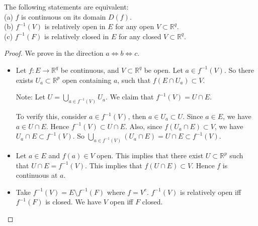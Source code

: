 \begin{theorem}
	The following statements are equivalent:\\
(a) $f$ is continuous on its domain $D(f)$.\\
(b) $f^{-1}(V)$ is relatively open in $E$ for any open  $V \subset \mathbb{R}^q$.\\
(c) $f^{-1} (F)$ is relatively closed in $E$ for any closed $V \subset \mathbb{R}^q$.
\end{theorem}
\begin{proof}
	We prove in the direction $a\iff  b \iff  c$.
	\begin{itemize}
		\item [(a) implies (b)]
			Let $f: E \to  \mathbb{R}^q$ be continuous, and $V \subset \mathbb{R}^q$ be open. Let $a \in f^{-1} (V)$. So there exists $U_a \subset \mathbb{R}^p$ open containing $a$, such that $f(E \cap U_a) \subset V$. 

			Note: Let $U = \bigcup_{a \in f^{-1} (V)} U_a $. We claim that $f^{-1} (V) = U \cap E$.

			To verify this, consider $a \in f^{-1} (V)$, then $a \in U_a \subset U$. Since $a \in E$, we have $a \in U \cap E$. Hence $f^{-1} (V) \subset U \cap E$.
			Also, since $f(U_a \cap E) \subset V$, we have $U_a \cap E \subset f^{-1} (V)$. So $\bigcup_{a \in f^{-1} (V)} \left( U_a \cap E \right)  = U \cap E \subset f^{-1} (V)$.
		\item [(b) implies (a)]
			Let $a \in E$ and $f(a) \in V$ open. This implies that there exist $U \subset \mathbb{R}^p $ such that $U \cap E = f^{-1} (V)$. This implies that $f(U \cap E) \subset V$. Hence $f$ is continuous at $a$.
		\item [(b) equivalent to (c)]
			Take $f^{-1} (V) = E \setminus f^{-1} (F)$ where $f = V^c$. $f^{-1} (V)$ is relatively open iff $f^{-1} (F)$ is closed. We have $V$ open iff $F$ closed.
	\end{itemize}
\end{proof}


